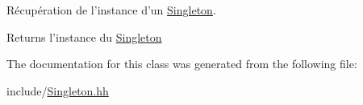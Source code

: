 Récupération de l'instance d'un \hyperlink{classmognetwork_1_1_singleton}{Singleton}. 

\begin{DoxyReturn}{Returns}
l'instance du \hyperlink{classmognetwork_1_1_singleton}{Singleton} 
\end{DoxyReturn}


The documentation for this class was generated from the following file\-:\begin{DoxyCompactItemize}
\item 
include/\hyperlink{_singleton_8hh}{Singleton.\-hh}\end{DoxyCompactItemize}
